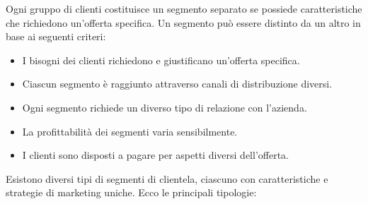 Ogni gruppo di clienti costituisce un segmento separato se possiede caratteristiche che richiedono un’offerta specifica. Un segmento può essere distinto da un altro in base ai seguenti criteri:
\begin{itemize}
    \item I bisogni dei clienti richiedono e giustificano un’offerta specifica.
    \item Ciascun segmento è raggiunto attraverso canali di distribuzione diversi.
    \item Ogni segmento richiede un diverso tipo di relazione con l’azienda.
    \item La profittabilità dei segmenti varia sensibilmente.
    \item I clienti sono disposti a pagare per aspetti diversi dell’offerta.
\end{itemize}
Esistono diversi tipi di segmenti di clientela, ciascuno con caratteristiche e strategie di marketing uniche. Ecco le principali tipologie:
